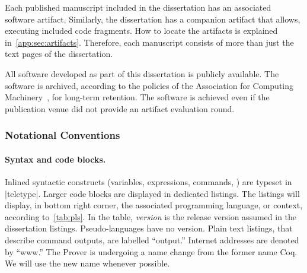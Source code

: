 Each published manuscript included in the dissertation has an associated software artifact.
Similarly, the dissertation has a companion artifact that allows, \eg executing included code fragments.
How to locate the artifacts is explained in~\autoref{app:sec:artifacts}.
Therefore, each manuscript consists of more than just the text pages of the dissertation.

All software developed as part of this dissertation is publicly available.
The software is archived, according to the policies of the Association for Computing Machinery~\cite{acm_badging}, for long-term retention.
The software is achieved even if the publication venue did not provide an artifact evaluation round.

\subsubsection{Notational Conventions}

\paragraph*{Syntax and code blocks.}
Inlined syntactic constructs (variables, expressions, commands, \etc) are typeset in \pr|teletype|.
Larger code blocks are displayed in dedicated listings.
The listings will display, in bottom right corner, the associated programming language, or context, according to~\autoref{tab:pls}.
In the table, \emph{version} is the release version assumed in the dissertation listings.
Pseudo-languages have no version.
Plain text listings, that describe command outputs, are labelled \enquote{output.}
Internet addresses are denoted by  \enquote{www.}
The  Prover is undergoing a name change from the former name Coq.
We will use the new name whenever possible.

